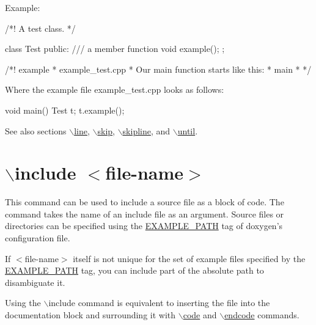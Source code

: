 \begin{DoxyParagraph}{Example:}

\begin{DoxyVerbInclude}

/*! A test class. */

class Test
{
  public:
    /// a member function
    void example();
};

/*! \page example
 *  \dontinclude example_test.cpp
 *  Our main function starts like this:
 *  \skip main
 *  
 */
\end{DoxyVerbInclude}
 Where the example file {\ttfamily example\_\-test.cpp} looks as follows: 
\begin{DoxyVerbInclude}
void main()
{
  Test t;
  t.example();
}
\end{DoxyVerbInclude}
 
\end{DoxyParagraph}
\begin{DoxySeeAlso}{See also}
sections \hyperlink{commands_cmdline}{$\backslash$line}, \hyperlink{commands_cmdskip}{$\backslash$skip}, \hyperlink{commands_cmdskipline}{$\backslash$skipline}, and \hyperlink{commands_cmduntil}{$\backslash$until}.
\end{DoxySeeAlso}


 \hypertarget{commands_cmdinclude}{}\section{$\backslash$include $<$file-\/name$>$}\label{commands_cmdinclude}
 This command can be used to include a source file as a block of code. The command takes the name of an include file as an argument. Source files or directories can be specified using the \hyperlink{config_cfg_example_path}{EXAMPLE\_\-PATH} tag of doxygen's configuration file.

If $<$file-\/name$>$ itself is not unique for the set of example files specified by the \hyperlink{config_cfg_example_path}{EXAMPLE\_\-PATH} tag, you can include part of the absolute path to disambiguate it.

Using the $\backslash$include command is equivalent to inserting the file into the documentation block and surrounding it with \hyperlink{commands_cmdcode}{$\backslash$code} and \hyperlink{commands_cmdendcode}{$\backslash$endcode} commands.

